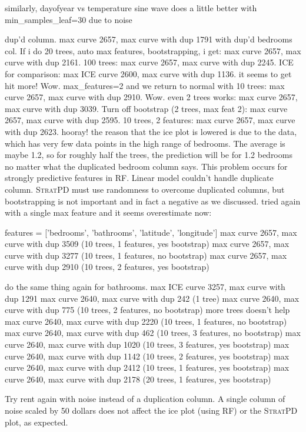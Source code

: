 \documentclass[12pt]{article}
\newcommand{\spd}{\fontfamily{cmr}\textsc{\small StratPD}}
\begin{document}
similarly, dayofyear vs temperature sine wave does a little better with min\_samples\_leaf=30 due to noise

dup'd column. max curve 2657, max curve with dup 1791 with dup'd bedrooms col.  If i do 20 trees, auto max features, bootstrapping, i get: max curve 2657, max curve with dup 2161. 100 trees: max curve 2657, max curve with dup 2245. ICE for comparison: max ICE curve 2600, max curve with dup 1136. it seems to get hit more! Wow. max\_features=2 and we return to normal with 10 trees: max curve 2657, max curve with dup 2910. Wow. even 2 trees works: max curve 2657, max curve with dup 3039. Turn off bootstrap (2 trees, max feat 2): max curve 2657, max curve with dup 2595. 10 trees, 2 features: max curve 2657, max curve with dup 2623. hooray!  the reason that the ice plot is lowered is due to the data, which has very few data points in the high range of bedrooms. The average is maybe 1.2, so for roughly half the trees, the prediction will be for 1.2 bedrooms no matter what the duplicated bedroom column says.  This problem occurs for strongly predictive features in RF. Linear model couldn't handle duplicate column. \spd{} must use randomness to overcome duplicated columns, but bootstrapping is not important and in fact a negative as we discussed.   tried again with a single max feature and it seems overestimate now:

features = ['bedrooms', 'bathrooms', 'latitude', 'longitude']
max curve 2657, max curve with dup 3509 (10 trees, 1 features, yes bootstrap)
max curve 2657, max curve with dup 3277 (10 trees, 1 features, no bootstrap)
max curve 2657, max curve with dup 2910 (10 trees, 2 features, yes bootstrap)

do the same thing again for bathrooms.
max ICE curve 3257, max curve with dup 1291
max curve 2640, max curve with dup 242 (1 tree)
max curve 2640, max curve with dup 775 (10 trees, 2 features, no bootstrap) more trees doesn't help
max curve 2640, max curve with dup 2220 (10 trees, 1 features, no bootstrap)
max curve 2640, max curve with dup 462 (10 trees, 3 features, no bootstrap)
max curve 2640, max curve with dup 1020 (10 trees, 3 features, yes bootstrap)
max curve 2640, max curve with dup 1142 (10 trees, 2 features, yes bootstrap)
max curve 2640, max curve with dup 2412 (10 trees, 1 features, yes bootstrap)
max curve 2640, max curve with dup 2178 (20 trees, 1 features, yes bootstrap)

Try rent again with noise instead of a duplication column. A single column of noise scaled by 50 dollars does not affect the ice plot (using RF) or the \spd{} plot, as expected.
\end{document}
